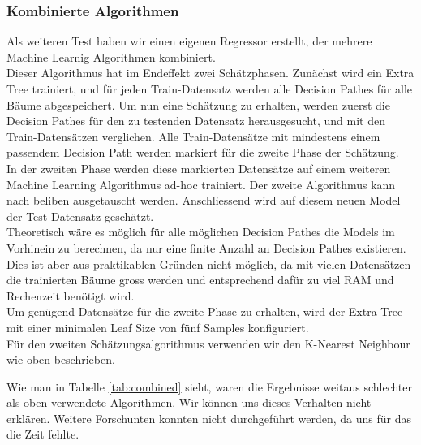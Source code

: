 \subsubsection{Kombinierte Algorithmen}
Als weiteren Test haben wir einen eigenen Regressor erstellt, der mehrere Machine Learnig Algorithmen kombiniert.\\[2ex]
%
Dieser Algorithmus hat im Endeffekt zwei Schätzphasen. Zunächst wird ein Extra Tree trainiert, und für jeden Train-Datensatz werden alle Decision Pathes für alle Bäume abgespeichert. Um nun eine Schätzung zu erhalten, werden zuerst die Decision Pathes für den zu testenden Datensatz herausgesucht, und mit den Train-Datensätzen verglichen. Alle Train-Datensätze mit mindestens einem passendem Decision Path werden markiert für die zweite Phase der Schätzung.\\
In der zweiten Phase werden diese markierten Datensätze auf einem weiteren Machine Learning Algorithmus ad-hoc trainiert. Der zweite Algorithmus kann nach beliben ausgetauscht werden. Anschliessend wird auf diesem neuen Model der Test-Datensatz geschätzt.\\
Theoretisch wäre es möglich für alle möglichen Decision Pathes die Models im Vorhinein zu berechnen, da nur eine finite Anzahl an Decision Pathes existieren. Dies ist aber aus praktikablen Gründen nicht möglich, da mit vielen Datensätzen die trainierten Bäume gross werden und entsprechend  dafür zu viel RAM und Rechenzeit benötigt wird.\\[2ex]
%
Um genügend Datensätze für die zweite Phase zu erhalten, wird der Extra Tree mit einer minimalen Leaf Size von fünf Samples konfiguriert.\\
Für den zweiten Schätzungsalgorithmus verwenden wir den K-Nearest Neighbour wie oben beschrieben.
%
\begin{table}[ht]
\centering
{}
\caption{Ergebnisse ohne ortsbezogenen Daten vom BFS}
\label{tab:combined}
\end{table}
%
Wie man in Tabelle \ref{tab:combined} sieht, waren die Ergebnisse weitaus schlechter als oben verwendete Algorithmen. Wir können uns dieses Verhalten nicht erklären. Weitere Forschunten konnten nicht durchgeführt werden, da uns für das die Zeit fehlte.\\[2ex]
